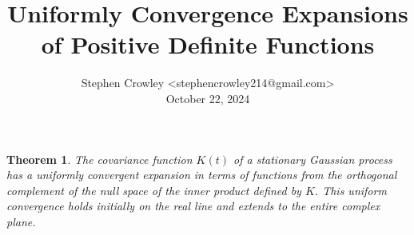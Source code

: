 \documentclass{article}
\newcommand{\tmaffiliation}[1]{\\ #1}
\newtheorem{theorem}{Theorem}
\begin{document}
\title{Uniformly Convergence Expansions of Positive Definite Functions}

\author{
  Stephen Crowley <stephencrowley214@gmail.com>
  \tmaffiliation{October 22, 2024}
}

\maketitle

\begin{theorem}
  The covariance function $K (t)$ of a stationary Gaussian process has a
  uniformly convergent expansion in terms of functions from the orthogonal
  complement of the null space of the inner product defined by $K$. This
  uniform convergence holds initially on the real line and extends to the
  entire complex plane.
\end{theorem}
\end{document}
